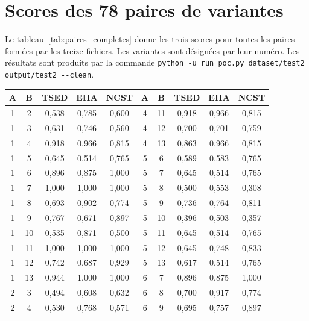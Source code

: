 \documentclass[12pt,a4paper,oneside]{report}
\begin{document}
\section{Scores des 78 paires de variantes}
\label{ann:paires}

Le tableau~\ref{tab:paires_completes} donne les trois scores pour toutes les
paires formées par les treize fichiers. Les variantes sont désignées par leur
numéro. Les résultats sont produits par la commande
\texttt{python -u run\_poc.py dataset/test2 output/test2 -{}-clean}.

\begin{table}[H]
\centering
\footnotesize
\renewcommand{\arraystretch}{1.05}
\begin{tabular}{ccccc@{\hspace{1.2cm}}ccccc}
\toprule
\textbf{A} & \textbf{B} & \textcolor{tsedcol}{\textbf{TSED}} & \textcolor{eiiacol}{\textbf{EIIA}} & \textcolor{ncstcol}{\textbf{NCST}} & \textbf{A} & \textbf{B} & \textcolor{tsedcol}{\textbf{TSED}} & \textcolor{eiiacol}{\textbf{EIIA}} & \textcolor{ncstcol}{\textbf{NCST}} \\
\midrule
1 & 2 & 0,538 & 0,785 & 0,600 & 4 & 11 & 0,918 & 0,966 & 0,815 \\
1 & 3 & 0,631 & 0,746 & 0,560 & 4 & 12 & 0,700 & 0,701 & 0,759 \\
1 & 4 & 0,918 & 0,966 & 0,815 & 4 & 13 & 0,863 & 0,966 & 0,815 \\
1 & 5 & 0,645 & 0,514 & 0,765 & 5 & 6 & 0,589 & 0,583 & 0,765 \\
1 & 6 & 0,896 & 0,875 & 1,000 & 5 & 7 & 0,645 & 0,514 & 0,765 \\
1 & 7 & 1,000 & 1,000 & 1,000 & 5 & 8 & 0,500 & 0,553 & 0,308 \\
1 & 8 & 0,693 & 0,902 & 0,774 & 5 & 9 & 0,736 & 0,764 & 0,811 \\
1 & 9 & 0,767 & 0,671 & 0,897 & 5 & 10 & 0,396 & 0,503 & 0,357 \\
1 & 10 & 0,535 & 0,871 & 0,500 & 5 & 11 & 0,645 & 0,514 & 0,765 \\
1 & 11 & 1,000 & 1,000 & 1,000 & 5 & 12 & 0,645 & 0,748 & 0,833 \\
1 & 12 & 0,742 & 0,687 & 0,929 & 5 & 13 & 0,617 & 0,514 & 0,765 \\
1 & 13 & 0,944 & 1,000 & 1,000 & 6 & 7 & 0,896 & 0,875 & 1,000 \\
2 & 3 & 0,494 & 0,608 & 0,632 & 6 & 8 & 0,700 & 0,917 & 0,774 \\
2 & 4 & 0,530 & 0,768 & 0,571 & 6 & 9 & 0,695 & 0,757 & 0,897 \\

\end{tabular}
\end{table}
\end{document}
